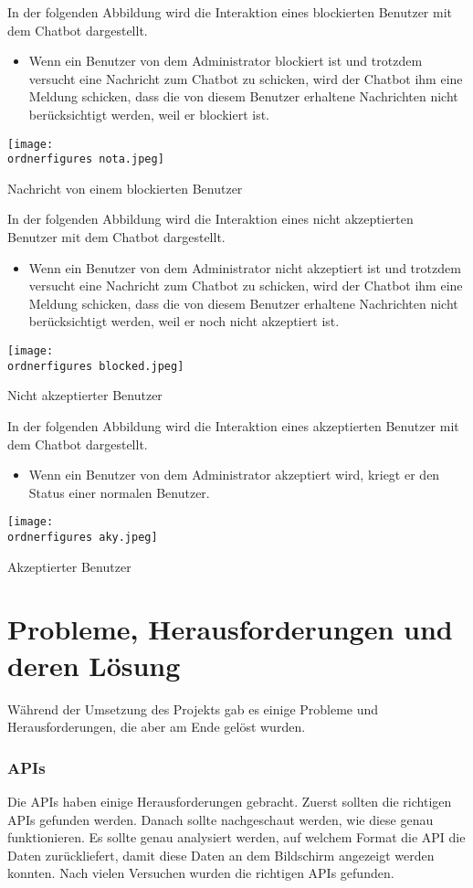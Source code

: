 In der folgenden Abbildung wird die Interaktion eines blockierten Benutzer mit dem Chatbot dargestellt.
\begin{itemize}
	\item Wenn ein Benutzer von dem Administrator blockiert ist und trotzdem versucht eine Nachricht zum Chatbot zu schicken, wird der Chatbot ihm eine Meldung schicken, dass die von diesem Benutzer erhaltene Nachrichten nicht ber\"ucksichtigt werden, weil er blockiert ist. 
\end{itemize}
\begin{center}
	\captionsetup{type=figure}
	\texttt{[image: \\ordnerfigures nota.jpeg]}
	\caption{Nachricht von einem blockierten Benutzer}
	\label{fig:chatbodfsd53}
\end{center}
In der folgenden Abbildung wird die Interaktion eines nicht akzeptierten Benutzer mit dem Chatbot dargestellt.
\begin{itemize}
	\item Wenn ein Benutzer von dem Administrator nicht akzeptiert ist und trotzdem versucht eine Nachricht zum Chatbot zu schicken, wird der Chatbot ihm eine Meldung schicken, dass die von diesem Benutzer erhaltene Nachrichten nicht ber\"ucksichtigt werden, weil er noch nicht akzeptiert ist. 
\end{itemize}
\begin{center}
	\captionsetup{type=figure}
	\texttt{[image: \\ordnerfigures blocked.jpeg]}
	\caption{Nicht akzeptierter Benutzer}
	\label{fig:chatb6dfsd53}
\end{center}
In der folgenden Abbildung wird die Interaktion eines akzeptierten Benutzer mit dem Chatbot dargestellt.
\begin{itemize}
	\item Wenn ein Benutzer von dem Administrator akzeptiert wird, kriegt er den Status einer normalen Benutzer.
\end{itemize}
\begin{center}
	\captionsetup{type=figure}
	\texttt{[image: \\ordnerfigures aky.jpeg]}
	\caption{Akzeptierter Benutzer }
	\label{fig:chatbodged53}
\end{center}
\section{Probleme, Herausforderungen und deren Lösung}
Während der Umsetzung des Projekts gab es einige Probleme und Herausforderungen, die aber am Ende gelöst wurden.
\subsubsection{APIs}
Die APIs haben einige Herausforderungen gebracht. Zuerst sollten die richtigen APIs gefunden werden. Danach sollte nachgeschaut werden, wie diese genau funktionieren. Es sollte genau analysiert werden, auf welchem Format die API die Daten zurückliefert, damit diese Daten an dem Bildschirm angezeigt werden konnten. Nach vielen Versuchen wurden die richtigen APIs gefunden.

